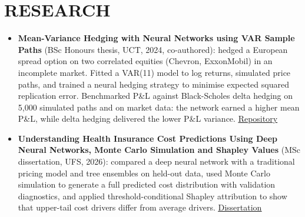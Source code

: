 \documentclass[letterpaper,11pt]{article}
\newcommand{\resumeItem}[1]{
  \item\small{
    {#1 \vspace{-1pt}}
  }
}
\newcommand{\resumeItemListStart}{\begin{itemize}[leftmargin=0.1in]}
\newcommand{\resumeItemListEnd}{\end{itemize}\vspace{-5pt}}
\begin{document}
\section{RESEARCH}
\vspace{4pt}
\resumeItemListStart
    \resumeItem{\normalsize{\textbf{Mean-Variance Hedging with Neural Networks using VAR Sample Paths} (BSc Honours thesis, UCT, 2024, co-authored): hedged a European spread option on two correlated equities (Chevron, ExxonMobil) in an incomplete market. Fitted a VAR(11) model to log returns, simulated price paths, and trained a neural hedging strategy to minimise expected squared replication error. Benchmarked P\&L against Black-Scholes delta hedging on 5,000 simulated paths and on market data: the network earned a higher mean P\&L, while delta hedging delivered the lower P\&L variance. \href{https://github.com/thabangTheActuaryCoder/BSc-Honours-Thesis-Mean-Variance-Hedging}{\color{blue}\underline{Repository}}}}
    \vspace{2pt}
    \resumeItem{\normalsize{\textbf{Understanding Health Insurance Cost Predictions Using Deep Neural Networks, Monte Carlo Simulation and Shapley Values} (MSc dissertation, UFS, 2026): compared a deep neural network with a traditional pricing model and tree ensembles on held-out data, used Monte Carlo simulation to generate a full predicted cost distribution with validation diagnostics, and applied threshold-conditional Shapley attribution to show that upper-tail cost drivers differ from average drivers. \href{https://github.com/thabangTheActuaryCoder/Msc-Mathematical-Statistics-Dissertation/blob/main/Baloyi_TBJ_MSc_Mathematical_Statistics_Dissertation_2026.pdf}{\color{blue}\underline{Dissertation}}}}
\resumeItemListEnd
\vspace{-4pt}

\end{document}
